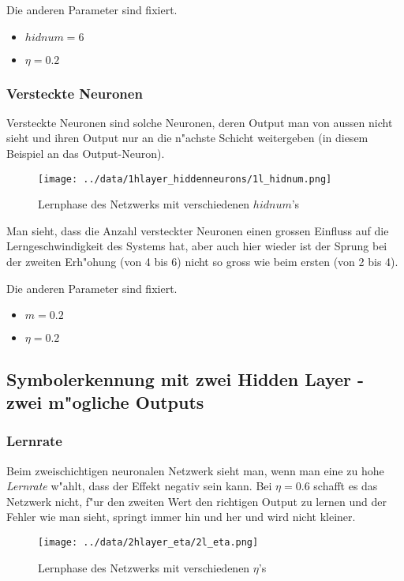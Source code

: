 \documentclass[10pt]{article}
\begin{document}
Die anderen Parameter sind fixiert.

\begin{itemize}
\item $hidnum = 6$
\item $\eta = 0.2$
\end{itemize}

\subsubsection{Versteckte Neuronen}

Versteckte Neuronen sind solche Neuronen, deren Output man von aussen nicht sieht und ihren Output nur an die n"achste Schicht weitergeben (in diesem Beispiel an das Output-Neuron).

\begin{figure}[!h]
\centering
\texttt{[image: ../data/1hlayer\_hiddenneurons/1l\_hidnum.png]}
\caption{Lernphase des Netzwerks mit verschiedenen $hidnum$'s}
\end{figure}
Man sieht, dass die Anzahl versteckter Neuronen einen grossen Einfluss auf die Lerngeschwindigkeit des Systems hat, aber auch hier wieder ist der Sprung bei der zweiten Erh"ohung (von 4 bis 6) nicht so gross wie beim ersten (von 2 bis 4).

Die anderen Parameter sind fixiert.

\begin{itemize}
\item $m = 0.2$
\item $\eta = 0.2$
\end{itemize}
\clearpage
\subsection{Symbolerkennung mit zwei Hidden Layer - zwei m"ogliche Outputs}

\subsubsection{Lernrate}

Beim zweischichtigen neuronalen Netzwerk sieht man, wenn man eine zu hohe \textit{Lernrate} w"ahlt, dass der Effekt negativ sein kann. Bei $\eta = 0.6$ schafft es das Netzwerk nicht, f"ur den zweiten Wert den richtigen Output zu lernen und der Fehler wie man sieht, springt immer hin und her und wird nicht kleiner.

\begin{figure}[!h]
\centering
\texttt{[image: ../data/2hlayer\_eta/2l\_eta.png]}
\caption{Lernphase des Netzwerks mit verschiedenen $\eta$'s}
\end{figure}
\end{document}
